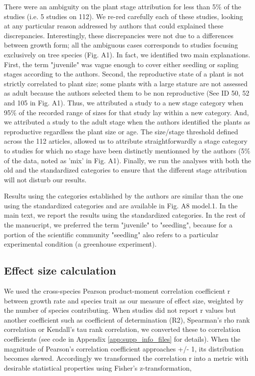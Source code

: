 \documentclass[a4paper]{article}\usepackage[]{graphicx}\usepackage[]{color}
\begin{document}
There were an ambiguity on the plant stage attribution for less than 5\% of the studies (i.e. 5 studies on 112). We re-red carefully each of these studies, looking at any particular reason addressed by authors that could explained these discrepancies. Interestingly, these discrepancies were not due to a differences between growth form; all the ambiguous cases corresponds to studies focusing exclusively on tree species (Fig. A1). In fact, we identified two main explanations. First, the term "juvenile" was vague enough to cover either seedling or sapling stages according to the authors. Second, the reproductive state of a plant is not strictly correlated to plant size; some plants with a large stature are not assessed as adult because the authors selected them to be non reproductive (See ID 50, 52 and 105 in Fig. A1). Thus, we attributed a study to a new stage category when 95\% of the recorded range of sizes for that study lay within a new category. And, we attributed a study to the adult stage when the authors identified the plants as reproductive regardless the plant size or age. The size/stage threshold defined across the 112 articles, allowed us to attribute straightforwardly a stage category to studies for which no stage have been distinctly mentionned by the authors (5\% of the data, noted as 'mix' in Fig. A1). Finally, we run the analyses with both the old and the standardized categories to ensure that the different stage attribution will not disturb our results. 

Results using the categories established by the authors are similar than the one using the standardized categories and are available in Fig. A8 model.1. In the main text, we report the results using the standardized categories. In the rest of the mansucript, we preferred the term "juvenile" to "seedling", because for a portion of the scientific community "seedling" also refers to a particular experimental condition (a greenhouse experiment).



\subsection*{Effect size calculation}\label{effect-size-calculation}

We used the cross-species Pearson product-moment correlation coefficient r between growth rate and species trait as our measure of effect size, weighted by the number of species contributing. When studies did not report r values but another coefficient such as coefficient of determination (R2), Spearman's rho rank correlation or Kendall's tau rank correlation, we converted these to correlation coefficients  \citep{Lajeunesse:2013tm} (see code in Appendix \ref{app:supp_info_files} for details). When the magnitude of Pearson's correlation coefficient approaches +/- 1, its distribution becomes skewed. Accordingly we transformed the correlation r into a metric with desirable statistical properties using Fisher's z-transformation,
\end{document}
